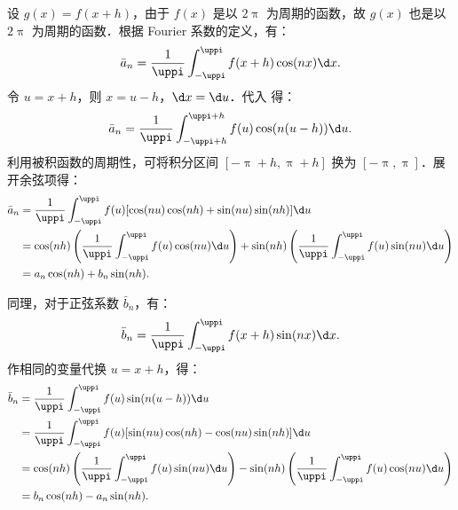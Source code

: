 \begin{myproof}
    设 $g(x) = f(x+h)$，由于 $f(x)$ 是以 $2\uppi$ 为周期的函数，故 $g(x)$ 也是以 $2\uppi$ 为周期的函数．根据 Fourier 系数的定义，有：
    \begin{equation}\label{eq:shift-a}
        \bar{a}_n = \frac{1}{\uppi} \int_{-\uppi}^{\uppi} f(x+h) \cos(nx) \d x.
    \end{equation}
    令 $u = x+h$，则 $x = u-h$，$\d x = \d u$．代入  得：
    \begin{equation}
        \bar{a}_n = \frac{1}{\uppi} \int_{-\uppi+h}^{\uppi+h} f(u) \cos(n(u-h)) \d u.
    \end{equation}
    利用被积函数的周期性，可将积分区间 $[-\uppi+h, \uppi+h]$ 换为 $[-\uppi, \uppi]$．展开余弦项得：
    \begin{equation}
        \begin{aligned}
            \bar{a}_n & = \frac{1}{\uppi} \int_{-\uppi}^{\uppi} f(u) [\cos(nu) \cos(nh) + \sin(nu) \sin(nh)] \d u                                                                             \\
                      & = \cos(nh) \left( \frac{1}{\uppi} \int_{-\uppi}^{\uppi} f(u) \cos(nu) \d u \right) + \sin(nh) \left( \frac{1}{\uppi} \int_{-\uppi}^{\uppi} f(u) \sin(nu) \d u \right) \\
                      & = a_n \cos(nh) + b_n \sin(nh).
        \end{aligned}
    \end{equation}

    同理，对于正弦系数 $\bar{b}_n$，有：
    \begin{equation}
        \bar{b}_n = \frac{1}{\uppi} \int_{-\uppi}^{\uppi} f(x+h) \sin(nx) \d x.
    \end{equation}
    作相同的变量代换 $u = x+h$，得：
    \begin{equation}
        \begin{aligned}
            \bar{b}_n & = \frac{1}{\uppi} \int_{-\uppi}^{\uppi} f(u) \sin(n(u-h)) \d u                                                                                                        \\
                      & = \frac{1}{\uppi} \int_{-\uppi}^{\uppi} f(u) [\sin(nu) \cos(nh) - \cos(nu) \sin(nh)] \d u                                                                             \\
                      & = \cos(nh) \left( \frac{1}{\uppi} \int_{-\uppi}^{\uppi} f(u) \sin(nu) \d u \right) - \sin(nh) \left( \frac{1}{\uppi} \int_{-\uppi}^{\uppi} f(u) \cos(nu) \d u \right) \\
                      & = b_n \cos(nh) - a_n \sin(nh).
        \end{aligned}
    \end{equation}


\end{myproof}

